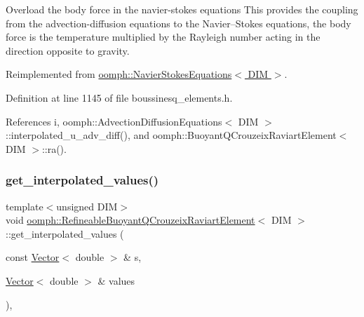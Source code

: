 Overload the body force in the navier-\/stokes equations This provides the coupling from the advection-\/diffusion equations to the Navier--Stokes equations, the body force is the temperature multiplied by the Rayleigh number acting in the direction opposite to gravity. 



Reimplemented from \hyperlink{classoomph_1_1NavierStokesEquations_a8a3f44daab0e804f2d9b03ab9a962440}{oomph\+::\+Navier\+Stokes\+Equations$<$ D\+I\+M $>$}.



Definition at line 1145 of file boussinesq\+\_\+elements.\+h.



References i, oomph\+::\+Advection\+Diffusion\+Equations$<$ D\+I\+M $>$\+::interpolated\+\_\+u\+\_\+adv\+\_\+diff(), and oomph\+::\+Buoyant\+Q\+Crouzeix\+Raviart\+Element$<$ D\+I\+M $>$\+::ra().

\mbox{\label{classoomph_1_1RefineableBuoyantQCrouzeixRaviartElement_aa89e116d612b3530edd2b0666d25cf01}} 
\subsubsection{\texorpdfstring{get\+\_\+interpolated\+\_\+values()}{get\_interpolated\_values()}\hspace{0.1cm}{\footnotesize\ttfamily [1/2]}}
{\footnotesize\ttfamily template$<$unsigned D\+IM$>$ \\
void \hyperlink{classoomph_1_1RefineableBuoyantQCrouzeixRaviartElement}{oomph\+::\+Refineable\+Buoyant\+Q\+Crouzeix\+Raviart\+Element}$<$ D\+IM $>$\+::get\+\_\+interpolated\+\_\+values (\begin{DoxyParamCaption}\item[{const \hyperlink{classoomph_1_1Vector}{Vector}$<$ double $>$ \&}]{s,  }\item[{\hyperlink{classoomph_1_1Vector}{Vector}$<$ double $>$ \&}]{values }\end{DoxyParamCaption})\hspace{0.3cm}{\ttfamily [inline]}, {\ttfamily [virtual]}}



